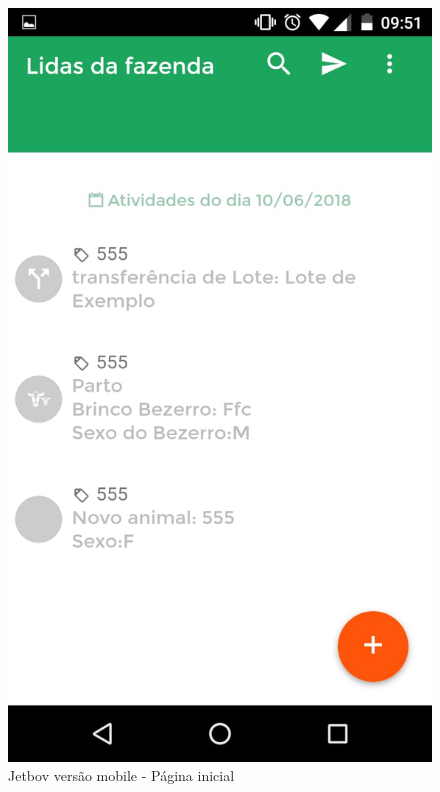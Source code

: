 \documentclass[12pt]{article}
\begin{document}
\begin{titlepage}
\begin{figure}[!h]
\begin{center}
\caption{Jetbov versão mobile - Página inicial}
\includegraphics[width=6in]{img/jetbovapp1.jpeg}

\end{center}
\end{figure}


\end{titlepage}
\end{document}
